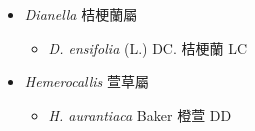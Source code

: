 
  \begin{itemize}
 \item[] \textit{Dianella} 桔梗蘭屬
                                
  \begin{itemize}
        \item[] \textit{D. ensifolia} (L.) DC.  桔梗蘭   LC
  \end{itemize}
 \item[] \textit{Hemerocallis} 萱草屬
                                
  \begin{itemize}
        \item[] \textit{H. aurantiaca} Baker  橙萱   DD
  \end{itemize}
  \end{itemize}
